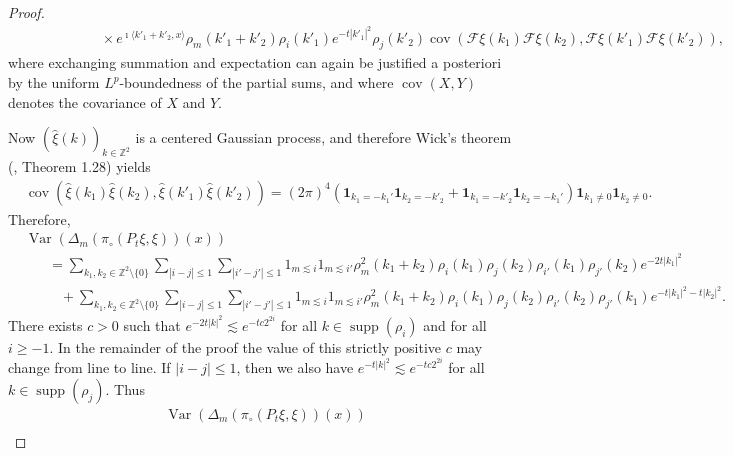 \documentclass[11pt,a4paper]{article}
\newcommand{\tmop}[1]{\ensuremath{\operatorname{#1}}}
\theoremstyle{remark}
\newcommand{\CF}{\ensuremath{\mathscr{F}}}
\begin{document}
\begin{proof}
\begin{align*}
      &\hspace{65pt} \times e^{\imath \langle k'_1 + k'_2, x \rangle} \rho_m (k'_1 + k'_2 ) \rho_i ( k'_1 ) e^{- t | k'_1 |^2}\rho_j ( k'_2 ) \tmop{cov}(\CF{\xi} ( k_1 )\CF{\xi} ( k_2 ), \CF{\xi} ( k'_1 ) \CF{\xi}( k'_2 ) ),
   \end{align*}
   where exchanging summation and expectation can again be justified a posteriori by the uniform $L^p$-boundedness of the partial sums, and where $\tmop{cov}(X,Y)$ denotes the covariance of $X$ and $Y$.
    
   Now $( \widehat{\xi} (k) )_{k \in \mathbb{Z}^2}$ is a centered Gaussian process, and therefore Wick's theorem (\cite{Janson1997}, Theorem 1.28) yields
   \begin{align*}
      &\tmop{cov} ( \widehat{\xi} ( k_1 ) \widehat{\xi} (k_2), \widehat{\xi} ( k'_1 ) \widehat{\xi} (k'_2)) = ( 2 \pi )^4 ( \mathbf{1}_{k_1=-k_1'} \mathbf{1}_{k_2 = - k'_2} + \mathbf{1}_{k_1 = - k'_2} \mathbf{1}_{k_2 = - k_1'} ) \mathbf{1}_{k_1 \neq 0} \mathbf{1}_{k_2 \neq 0}.
   \end{align*}
   Therefore,
   \begin{align*}
      &\tmop{Var} ( \Delta_m ( \pi_{\circ} ( P_t \xi, \xi )) ( x ) ) \\
      &\hspace{20pt} = \sum_{k_1, k_2 \in \mathbb{Z}^2 \setminus\{0\}} \sum_{| i - j|\leqslant 1} \sum_{| i' - j'| \leqslant 1} 1_{m \lesssim i} 1_{m \lesssim i'} \rho^2_m(k_1 + k_2) \rho_i ( k_1 ) \rho_j ( k_2 )\rho_{i'} ( k_1 ) \rho_{j'} ( k_2 ) e^{- 2 t |k_1 |^2}\\
      &\hspace{30pt} + \sum_{k_1, k_2 \in \mathbb{Z}^2 \setminus\{0\}} \sum_{| i - j | \leqslant 1} \sum_{| i' - j' | \leqslant 1} 1_{m \lesssim i} 1_{m \lesssim i'} \rho^2_m (k_1 + k_2 ) \rho_i ( k_1 ) \rho_j ( k_2 ) \rho_{i'} ( k_2 ) \rho_{j'} ( k_1 ) e^{- t |k_1 |^2 - t | k_2 |^2}.
   \end{align*}
   There exists $c > 0$ such that $e^{- 2 t | k|^2} \lesssim e^{- t c 2^{2 i}}$ for all $k \in \tmop{supp} ( \rho_i )$ and for all $i \ge -1$. In the  remainder of the proof the value of this strictly positive $c$ may change from line to line. If $| i - j | \leqslant 1$, then we also have $e^{- t | k |^2} \lesssim e^{- t c 2^{2 i}}$ for all $k \in \tmop{supp} ( \rho_j )$. Thus
   \begin{align}\label{e:anderson area var}\nonumber
      & \tmop{Var} ( \Delta_m ( \pi_{\circ} ( P_t \xi, \xi )) ( x ) )\\ \nonumber

\end{align}
\end{proof}
\end{document}
